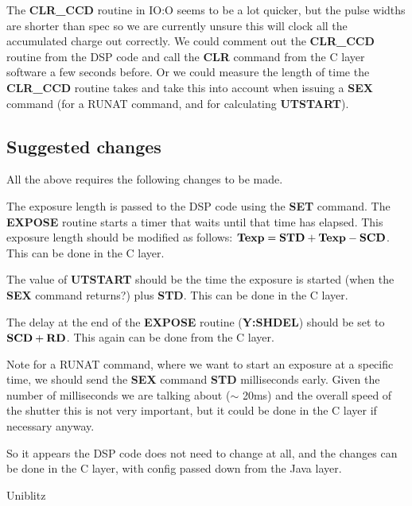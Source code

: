\documentclass[10pt,a4paper]{article}
\begin{document}
The {\bf CLR\_CCD} routine in IO:O seems to be a lot quicker, but the pulse widths are shorter than spec so we 
are currently unsure this will clock all the accumulated charge out correctly. We could comment out the 
{\bf CLR\_CCD} routine from the DSP code and call the {\bf CLR} command from the C layer software a few seconds before.
Or we could measure the length of time the {\bf CLR\_CCD} routine takes and take this into account when issuing
a {\bf SEX} command (for a RUNAT command, and for calculating {\bf UTSTART}).


\subsection{Suggested changes}

All the above requires the following changes to be made.

The exposure length is passed to the DSP code using the {\bf SET} command. The {\bf EXPOSE} routine starts a timer
that waits until that time has elapsed. This exposure length should be modified as follows:
${\bf Texp} = {\bf STD} + {\bf Texp} - {\bf SCD}$. This can be done in the C layer.

The value of {\bf UTSTART} should be the time the exposure is started (when the {\bf SEX} command returns?)
 plus {\bf STD}. This can be done in the C layer.

The delay at the end of the {\bf EXPOSE} routine ({\bf Y:SHDEL}) should be set to ${\bf SCD} + {\bf RD}$.
This again can be done from the C layer.

Note for a RUNAT command, where we want to start an exposure at a specific time, we should send the
{\bf SEX} command {\bf STD} milliseconds early. Given the number of milliseconds we are talking about ($\sim$ 20ms)
and the overall speed of the shutter this is not very important, but it could be done in the C layer if necessary anyway.

So it appears the DSP code does not need to change at all, and the changes can be done in the C layer, with
config passed down from the Java layer.

\begin{thebibliography}{99}

Uniblitz 

\end{thebibliography}
\end{document}
